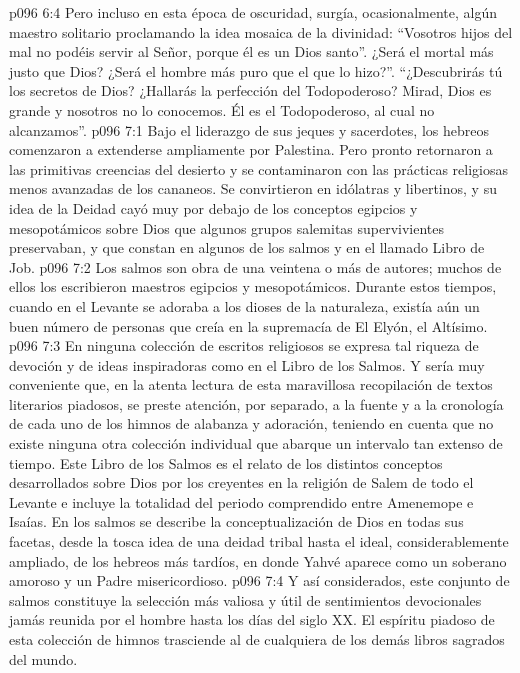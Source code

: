 \vs p096 6:4 Pero incluso en esta época de oscuridad, surgía, ocasionalmente, algún maestro solitario proclamando la idea mosaica de la divinidad: “Vosotros hijos del mal no podéis servir al Señor, porque él es un Dios santo”. ¿Será el mortal más justo que Dios? ¿Será el hombre más puro que el que lo hizo?”. “¿Descubrirás tú los secretos de Dios? ¿Hallarás la perfección del Todopoderoso? Mirad, Dios es grande y nosotros no lo conocemos. Él es el Todopoderoso, al cual no alcanzamos”.
\vs p096 7:1 Bajo el liderazgo de sus jeques y sacerdotes, los hebreos comenzaron a extenderse ampliamente por Palestina. Pero pronto retornaron a las primitivas creencias del desierto y se contaminaron con las prácticas religiosas menos avanzadas de los cananeos. Se convirtieron en idólatras y libertinos, y su idea de la Deidad cayó muy por debajo de los conceptos egipcios y mesopotámicos sobre Dios que algunos grupos salemitas supervivientes preservaban, y que constan en algunos de los salmos y en el llamado Libro de Job.
\vs p096 7:2 \pc Los salmos son obra de una veintena o más de autores; muchos de ellos los escribieron maestros egipcios y mesopotámicos. Durante estos tiempos, cuando en el Levante se adoraba a los dioses de la naturaleza, existía aún un buen número de personas que creía en la supremacía de El Elyón, el Altísimo.
\vs p096 7:3 En ninguna colección de escritos religiosos se expresa tal riqueza de devoción y de ideas inspiradoras como en el Libro de los Salmos. Y sería muy conveniente que, en la atenta lectura de esta maravillosa recopilación de textos literarios piadosos, se preste atención, por separado, a la fuente y a la cronología de cada uno de los himnos de alabanza y adoración, teniendo en cuenta que no existe ninguna otra colección individual que abarque un intervalo tan extenso de tiempo. Este Libro de los Salmos es el relato de los distintos conceptos desarrollados sobre Dios por los creyentes en la religión de Salem de todo el Levante e incluye la totalidad del periodo comprendido entre Amenemope e Isaías. En los salmos se describe la conceptualización de Dios en todas sus facetas, desde la tosca idea de una deidad tribal hasta el ideal, considerablemente ampliado, de los hebreos más tardíos, en donde Yahvé aparece como un soberano amoroso y un Padre misericordioso.
\vs p096 7:4 Y así considerados, este conjunto de salmos constituye la selección más valiosa y útil de sentimientos devocionales jamás reunida por el hombre hasta los días del siglo XX. El espíritu piadoso de esta colección de himnos trasciende al de cualquiera de los demás libros sagrados del mundo.

